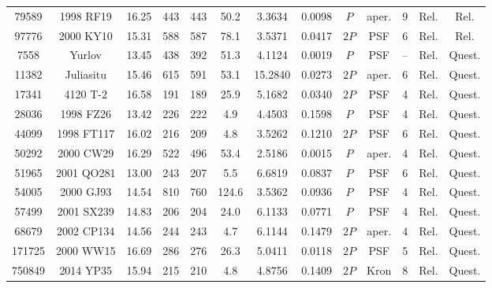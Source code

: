 \begin{table}[!p]
\begin{tabular}{ccccccccccccc}
79589 & 1998 RF19 & 16.25 & 443 & 443 & 50.2 & 3.3634 & 0.0098 & $P$ & aper. & 9 & Rel. & Rel. \\
97776 & 2000 KY10 & 15.31 & 588 & 587 & 78.1 & 3.5371 & 0.0417 & $2P$ & PSF & 6 & Rel. & Rel. \\
7558 & Yurlov & 13.45 & 438 & 392 & 51.3 & 4.1124 & 0.0019 & $P$ & PSF & -- & Rel. & Quest. \\
11382 & Juliasitu & 15.46 & 615 & 591 & 53.1 & 15.2840 & 0.0273 & $2P$ & aper. & 6 & Rel. & Quest. \\
17341 & 4120 T-2 & 16.58 & 191 & 189 & 25.9 & 5.1682 & 0.0340 & $2P$ & PSF & 4 & Rel. & Quest. \\
28036 & 1998 FZ26 & 13.42 & 226 & 222 & 4.9 & 4.4503 & 0.1598 & $P$ & PSF & 4 & Rel. & Quest. \\
44099 & 1998 FT117 & 16.02 & 216 & 209 & 4.8 & 3.5262 & 0.1210 & $2P$ & PSF & 6 & Rel. & Quest. \\
50292 & 2000 CW29 & 16.29 & 522 & 496 & 53.4 & 2.5186 & 0.0015 & $P$ & aper. & 4 & Rel. & Quest. \\
51965 & 2001 QO281 & 13.00 & 243 & 207 & 5.5 & 6.6819 & 0.0837 & $P$ & PSF & 6 & Rel. & Quest. \\
54005 & 2000 GJ93 & 14.54 & 810 & 760 & 124.6 & 3.5362 & 0.0936 & $P$ & PSF & 4 & Rel. & Quest. \\
57499 & 2001 SX239 & 14.83 & 206 & 204 & 24.0 & 6.1133 & 0.0771 & $P$ & PSF & 4 & Rel. & Quest. \\
68679 & 2002 CP134 & 14.56 & 244 & 243 & 4.7 & 6.1144 & 0.1479 & $2P$ & aper. & 4 & Rel. & Quest. \\
171725 & 2000 WW15 & 16.69 & 286 & 276 & 26.3 & 5.0411 & 0.0118 & $2P$ & PSF & 5 & Rel. & Quest. \\
750849 & 2014 YP35 & 15.94 & 215 & 210 & 4.8 & 4.8756 & 0.1409 & $2P$ & Kron & 8 & Rel. & Quest. \\
\bottomrule
\end{tabular}
\end{table}
